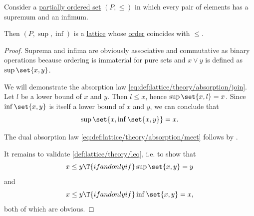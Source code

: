 \begin{proposition}\label{thm:lattice_via_order_relation}
  Consider a \hyperref[def:partially_ordered_set]{partially ordered set} \( (P, \leq) \) in which every pair of elements has a supremum and an infimum.

  Then \( (P, \sup, \inf) \) is a \hyperref[def:lattice]{lattice} whose \hyperref[def:lattice/theory/leq]{order} coincides with \( {\leq} \).
\end{proposition}
\begin{proof}
  Suprema and infima are obviously associative and commutative as binary operations because ordering is immaterial for pure sets and \( x \vee y \) is defined as \( \sup\set{ x, y } \).

  We will demonstrate the absorption law \eqref{eq:def:lattice/theory/absorption/join}. Let \( l \) be a lower bound of \( x \) and \( y \). Then \( l \leq x \), hence \( \sup\set{ x, l } = x \). Since \( \inf\set{ x, y } \) is itself a lower bound of \( x \) and \( y \), we can conclude that
  \begin{equation*}
    \sup\set{ x, \inf\set{ x, y } } = x.
  \end{equation*}

  The dual absorption law \eqref{eq:def:lattice/theory/absorption/meet} follows by .

  It remains to validate \cref{def:lattice/theory/leq}, i.e. to show that
  \begin{equation*}
    x \leq y \T{if and only if} \sup\set{ x, y } = y
  \end{equation*}
  and
  \begin{equation*}
    x \leq y \T{if and only if} \inf\set{ x, y } = x,
  \end{equation*}
  both of which are obvious.
\end{proof}

